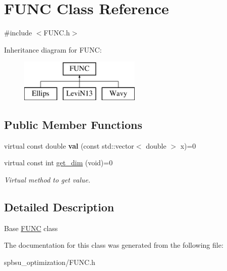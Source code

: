 \hypertarget{class_f_u_n_c}{}\section{F\+U\+NC Class Reference}
\label{class_f_u_n_c}


{\ttfamily \#include $<$F\+U\+N\+C.\+h$>$}

Inheritance diagram for F\+U\+NC\+:\begin{figure}[H]
\begin{center}
\leavevmode
\includegraphics[height=2.000000cm]{class_f_u_n_c}
\end{center}
\end{figure}
\subsection*{Public Member Functions}
\begin{DoxyCompactItemize}
\item 
\mbox{\label{class_f_u_n_c_a6355afe1bb2b020af84a1a76ff917a13}} 
virtual const double {\bfseries val} (const std\+::vector$<$ double $>$ x)=0
\item 
\mbox{\label{class_f_u_n_c_a0ba70f709ee6569ac2aa0a4ecd147564}} 
virtual const int \hyperlink{class_f_u_n_c_a0ba70f709ee6569ac2aa0a4ecd147564}{get\+\_\+dim} (void)=0
\begin{DoxyCompactList}\small\item\em Virtual method to get value. \end{DoxyCompactList}\end{DoxyCompactItemize}


\subsection{Detailed Description}
Base \hyperlink{class_f_u_n_c}{F\+U\+NC} class 

The documentation for this class was generated from the following file\+:\begin{DoxyCompactItemize}
\item 
spbsu\+\_\+optimization/F\+U\+N\+C.\+h\end{DoxyCompactItemize}
